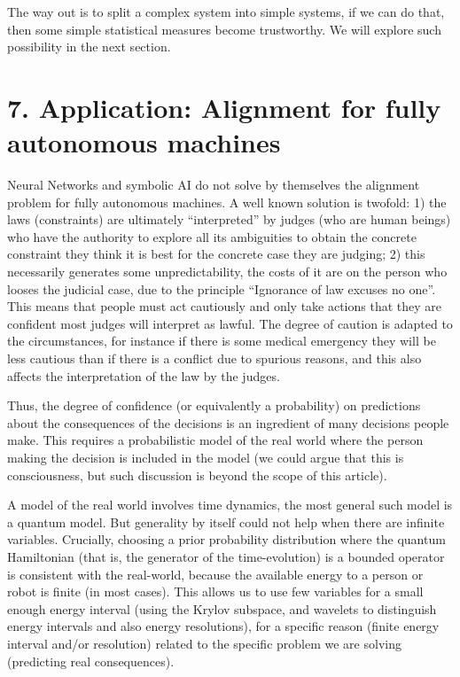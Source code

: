 \documentclass[11pt]{book}
\begin{document}
The way out is to split a complex system into simple systems, if we can
do that, then some simple statistical measures become trustworthy. We
will explore such possibility in the next section.

\hypertarget{application-alignment-for-fully-autonomous-machines}{%
\section{7. Application: Alignment for fully autonomous
machines}\label{application-alignment-for-fully-autonomous-machines}}

Neural Networks and symbolic AI do not solve by themselves the alignment
problem for fully autonomous machines. A well known solution is twofold:
1) the laws (constraints) are ultimately ``interpreted'' by judges (who
are human beings) who have the authority to explore all its ambiguities
to obtain the concrete constraint they think it is best for the concrete
case they are judging; 2) this necessarily generates some
unpredictability, the costs of it are on the person who looses the
judicial case, due to the principle ``Ignorance of law excuses no one''.
This means that people must act cautiously and only take actions that
they are confident most judges will interpret as lawful. The degree of
caution is adapted to the circumstances, for instance if there is some
medical emergency they will be less cautious than if there is a conflict
due to spurious reasons, and this also affects the interpretation of the
law by the judges.

Thus, the degree of confidence (or equivalently a probability) on
predictions about the consequences of the decisions is an ingredient of
many decisions people make. This requires a probabilistic model of the
real world where the person making the decision is included in the model
(we could argue that this is consciousness, but such discussion is
beyond the scope of this article).

A model of the real world involves time dynamics, the most general such
model is a quantum model. But generality by itself could not help when
there are infinite variables. Crucially, choosing a prior probability
distribution where the quantum Hamiltonian (that is, the generator of
the time-evolution) is a bounded operator is consistent with the
real-world, because the available energy to a person or robot is finite
(in most cases). This allows us to use few variables for a small enough
energy interval (using the Krylov subspace, and wavelets to distinguish
energy intervals and also energy resolutions), for a specific reason
(finite energy interval and/or resolution) related to the specific
problem we are solving (predicting real consequences).
\end{document}
